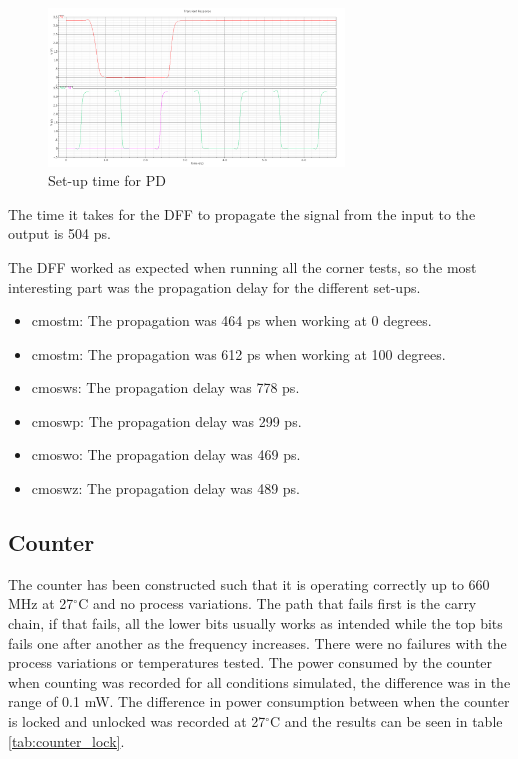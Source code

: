 \documentclass[a4paper,12pt]{article} \usepackage{graphicx}
\newcommand{\degree}{\ensuremath{^\circ}}
\begin{document}
\begin{figure}[h]
\centering
\includegraphics[width=0.7\textwidth]{../Bilder/set_up_PD.png}
\caption{Set-up time for PD}
\label{fig:set_up_PD}
\end{figure}

The time it takes for the DFF to propagate the signal from the input to the output is 504 ps.

The DFF worked as expected when running all the corner tests, so the most interesting part was the propagation delay for
the different set-ups.

\begin{itemize}
        \item cmostm: The propagation was 464 ps when working at 0 degrees.
        \item cmostm: The propagation was 612 ps when working at 100 degrees.
        \item cmosws: The propagation delay was 778 ps.
        \item cmoswp: The propagation delay was 299 ps.
        \item cmoswo: The propagation delay was 469 ps.
        \item cmoswz: The propagation delay was 489 ps.
\end{itemize}

\subsection{Counter}

The counter has been constructed such that it is operating correctly up to 660 MHz at
27$\degree$C and no process variations. The path that fails first is the carry chain,
if that fails, all the lower bits usually works as intended while the top bits fails
one after another as the frequency increases. There were no failures with the process
variations or temperatures tested. The power consumed by the counter when counting was
recorded for all conditions simulated, the difference was in the range of 0.1 mW. The
difference in power consumption between when the counter is locked and unlocked was
recorded at 27$\degree$C and the results can be seen in table \ref{tab:counter_lock}.
\end{document}

